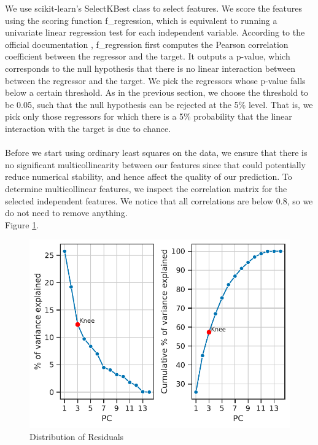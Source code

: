 \documentclass[11pt,a4paper]{article}
\begin{document}
We use scikit-learn's SelectKBest class to select features. We score the features using the scoring function f\_regression, which is equivalent to running a univariate linear regression test for each independent variable. According to the official documentation \cite{scikit-learn}, f\_regression first computes the Pearson correlation coefficient between the regressor and the target. It outputs a p-value, which corresponds to the null hypothesis that there is no linear interaction between between the regressor and the target. We pick the regressors whose p-value falls below a certain threshold. As in the previous section, we choose the threshold to be 0.05, such that the null hypothesis can be rejected at the 5\% level. That is, we pick only those regressors for which there is a 5\% probability that the linear interaction with the target is due to chance. \\ \\
Before we start using ordinary least squares on the data, we ensure that there is no significant multicollinearity between our features since that could potentially reduce numerical stability, and hence affect the quality of our prediction. To determine multicollinear features, we inspect the correlation matrix for the selected independent features. We notice that all correlations are below 0.8, so we do not need to remove anything. \\ 
Figure \ref{fds-project-template:fig:scree_plot}.
\begin{figure} [h!]
  \centering
  \includegraphics{report/scree_plot.pdf}
  \caption{Distribution of Residuals}
  \label{fds-project-template:fig:scree_plot}
\end{figure} \\ \\ 
\end{document}
